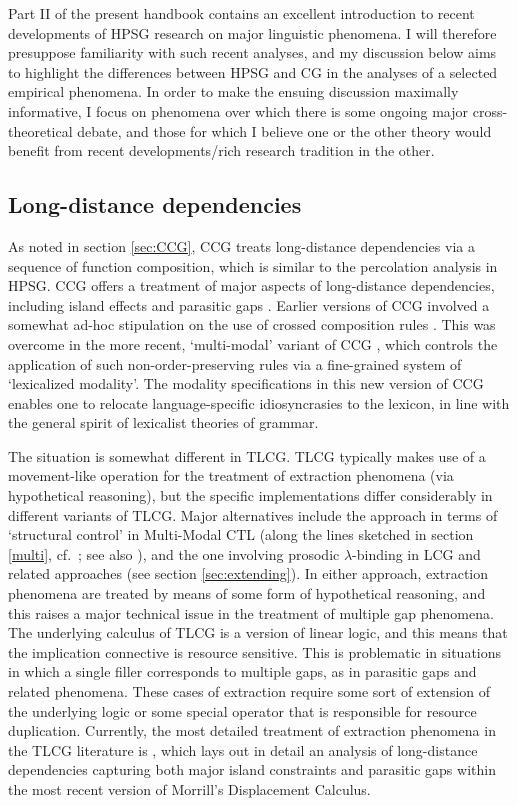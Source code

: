 \documentclass[output=paper]{langsci/langscibook}
\begin{document}
Part II of the present handbook contains an excellent introduction to
recent developments of HPSG research on major linguistic phenomena. I
will therefore presuppose familiarity with such recent analyses, and my discussion below aims to highlight the
differences between HPSG and CG in the analyses of a selected
empirical phenomena. In order to make the ensuing discussion maximally
informative, I focus on phenomena over which there is some ongoing
major cross-theoretical debate, and those for which I believe one or
the other theory would benefit from recent developments/rich research
tradition in the other.


\subsection{Long-distance dependencies}

As noted in section \ref{sec:CCG}, CCG treats long-distance
dependencies via a sequence of function composition, which is similar
to the \slasch percolation analysis in HPSG. CCG offers a treatment of
major aspects of long-distance dependencies, including island effects
\citep{Steedman2000a-u} and parasitic gaps \citep{Steedman87a-u}.
Earlier versions of CCG involved a somewhat ad-hoc stipulation on the
use of crossed composition rules \citep{Steedman97a}. This was
overcome in the more recent, `multi-modal' variant of CCG
\citep{Baldridge2002a-u}, which controls the application of such
non-order-preserving rules via a fine-grained system of `lexicalized
modality'. The modality specifications in this new version of CCG
enables one to relocate language-specific idiosyncrasies to the
lexicon, in line with the general spirit of lexicalist theories of
grammar.

The situation is somewhat different in TLCG. TLCG typically makes use
of a movement-like operation for the treatment of extraction
phenomena (via hypothetical reasoning), but the specific implementations differ considerably in
different variants of TLCG. Major alternatives include the approach in
terms of   `structural control' in Multi-Modal CTL (along the lines
sketched in section \ref{multi}, cf.~\citet{bernardiphd,Moortgat2011a-u};
see also \citet{Morrill94a-u}), and the one involving prosodic
$\lambda$-binding in LCG and related approaches (see section
\ref{sec:extending}). In either approach, extraction phenomena are
treated by means of some form of hypothetical reasoning, and this
raises a major technical issue in the treatment of multiple gap
phenomena. The underlying calculus of TLCG is a version of linear
logic, and this means that the implication connective is resource
sensitive. This is problematic in situations in which a single filler
corresponds to multiple gaps, as in parasitic gaps and related
phenomena. These cases of extraction require some sort of extension of
the underlying logic or some special operator that is responsible for
resource duplication. Currently, the most detailed treatment of
extraction phenomena in the TLCG literature is \citet{morrilllp},
which lays out in detail an analysis of long-distance dependencies
capturing both major island constraints and parasitic gaps within the
most recent version of Morrill's Displacement Calculus.
\end{document}
